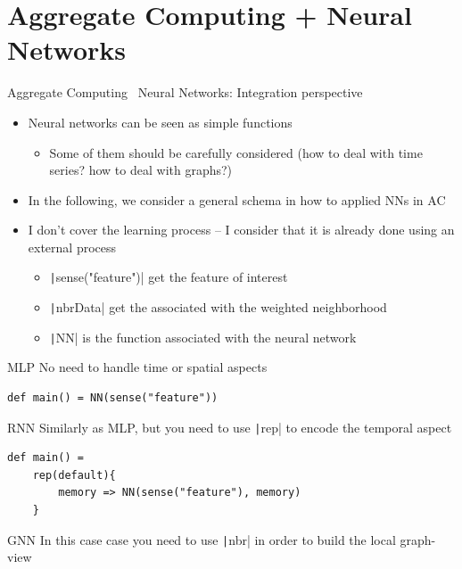 \documentclass[presentation, 9pt]{beamer}\mode<presentation>{\usetheme{AMSBolognaFC}}
\begin{document}
\section{Aggregate Computing + Neural Networks}
\begin{frame}{Aggregate Computing \faPlus \, Neural Networks: Integration perspective}
\begin{itemize} 
	\item Neural networks can be seen as simple functions
	\begin{itemize}
		\item Some of them should be carefully considered (how to deal with time series? how to deal with graphs?)
	\end{itemize}
	\item In the following, we consider a general schema in how to applied NNs in AC
	\item I don't cover the learning process -- I consider that it is already done using an external process
	\begin{itemize}
		\item \texttt|sense("feature")| get the feature of interest
		\item \texttt|nbrData| get the associated with the weighted neighborhood
		\item \texttt|NN| is the function associated with the neural network
	\end{itemize}
\end{itemize}
\begin{alertblock}{MLP}
No need to handle time or spatial aspects
\begin{verbatim}
def main() = NN(sense("feature"))
\end{verbatim}
\end{alertblock}
\begin{alertblock}{RNN}
Similarly as MLP, but you need to use \texttt|rep| to encode the temporal aspect
\begin{verbatim}
def main() = 
	rep(default){
		memory => NN(sense("feature"), memory)
	}
\end{verbatim}
\end{alertblock}
\begin{alertblock}{GNN}
	In this case case you need to use \texttt|nbr| in order to build the local graph-view

\end{alertblock}
\end{frame}
\end{document}
